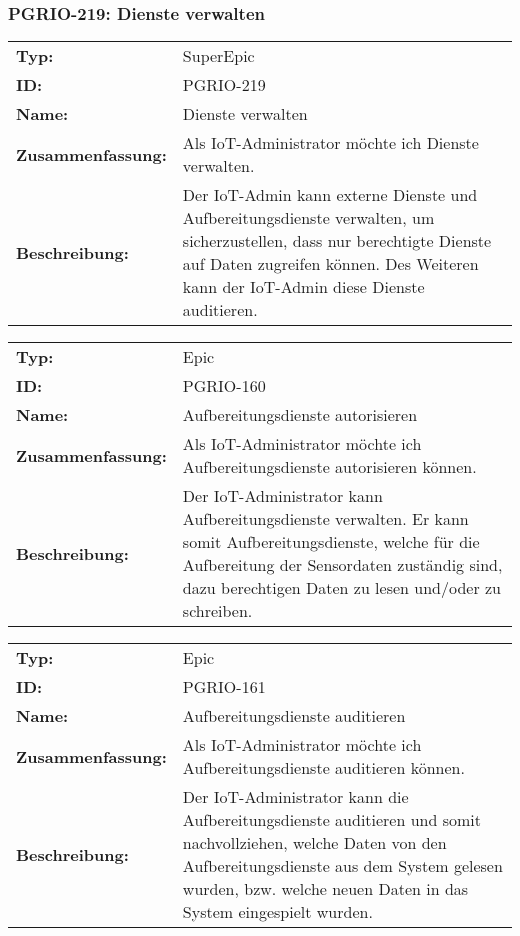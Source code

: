 	\subsubsection{PGRIO-219: Dienste verwalten} 
\begin{flushleft} 
\begin{tabular}{@{}lp{100mm}} 
\textbf{Typ:} & SuperEpic \\ 
\textbf{ID:} & PGRIO-219 \\ 
\textbf{Name:} & Dienste verwalten \\ 
\textbf{Zusammenfassung:} & Als IoT-Administrator möchte ich Dienste verwalten. \\ 
\textbf{Beschreibung:} & Der IoT-Admin kann externe Dienste und Aufbereitungsdienste verwalten, um sicherzustellen, dass nur berechtigte Dienste auf Daten zugreifen können. Des Weiteren kann der IoT-Admin diese Dienste auditieren. \\ 
\end{tabular} 
\end{flushleft} 

		\begin{flushleft} 
\begin{tabular}{@{}lp{100mm}} 
\textbf{Typ:} & Epic \\ 
\textbf{ID:} & PGRIO-160 \\ 
\textbf{Name:} & Aufbereitungsdienste autorisieren \\ 
\textbf{Zusammenfassung:} & Als IoT-Administrator möchte ich Aufbereitungsdienste autorisieren können. \\ 
\textbf{Beschreibung:} & Der IoT-Administrator kann Aufbereitungsdienste verwalten. Er kann somit Aufbereitungsdienste, welche für die Aufbereitung der Sensordaten zuständig sind, dazu berechtigen Daten zu lesen und/oder zu schreiben. \\ 
\end{tabular} 
\end{flushleft} 

		\begin{flushleft} 
\begin{tabular}{@{}lp{100mm}} 
\textbf{Typ:} & Epic \\ 
\textbf{ID:} & PGRIO-161 \\ 
\textbf{Name:} & Aufbereitungsdienste auditieren \\ 
\textbf{Zusammenfassung:} & Als IoT-Administrator möchte ich Aufbereitungsdienste auditieren können. \\ 
\textbf{Beschreibung:} & Der IoT-Administrator kann die Aufbereitungsdienste auditieren und somit nachvollziehen, welche Daten von den Aufbereitungsdienste aus dem System gelesen wurden, bzw. welche neuen Daten in das System eingespielt wurden. \\ 
\end{tabular} 
\end{flushleft} 

